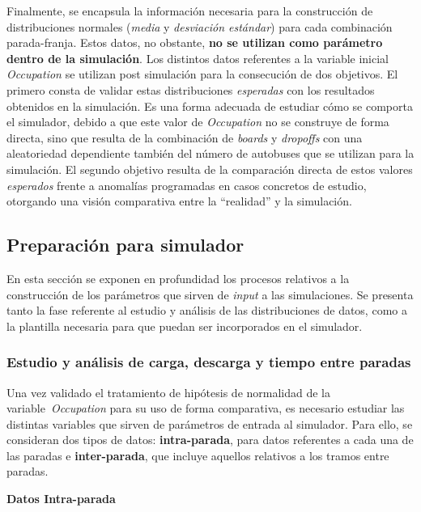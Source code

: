 Finalmente, se encapsula la información necesaria para la construcción de distribuciones normales (\textit{media}
y \textit{desviación estándar}) para cada combinación parada-franja. Estos datos, no obstante, \textbf{no se utilizan como 
parámetro dentro de la simulación}. Los distintos datos referentes a la variable inicial \textit{Occupation} se utilizan 
post simulación para la consecución de dos objetivos. El primero consta de validar estas distribuciones \textit{esperadas} 
con los resultados obtenidos en la simulación. Es una forma adecuada de estudiar cómo se comporta el simulador, debido a que 
este valor de \textit{Occupation} no se construye de forma directa, sino que resulta de la combinación de \textit{boards} y
\textit{dropoffs} con una aleatoriedad dependiente también del número de autobuses que se utilizan para la simulación.
El segundo objetivo resulta de la comparación directa de estos valores \textit{esperados} frente a anomalías programadas en casos
concretos de estudio, otorgando una visión comparativa entre la \enquote{realidad} y la simulación.

\subsection{Preparación para simulador}
En esta sección se exponen en profundidad los procesos relativos a la construcción de los parámetros que sirven de 
\textit{input} a las simulaciones. Se presenta tanto la fase referente al estudio y análisis de las distribuciones
de datos, como a la plantilla necesaria para que puedan ser incorporados en el simulador.


\subsubsection{Estudio y análisis de carga, descarga y tiempo entre paradas}
Una vez validado el tratamiento de hipótesis de normalidad de la variable~\textit{Occupation} para su uso de forma comparativa,
es necesario estudiar las distintas variables que sirven de parámetros de entrada al simulador. Para ello, se consideran dos 
tipos de datos: \textbf{intra-parada}, para datos referentes a cada una de las paradas e \textbf{inter-parada},
que incluye aquellos relativos a los tramos entre paradas.

\medskip
\noindent\textbf{Datos Intra-parada}

